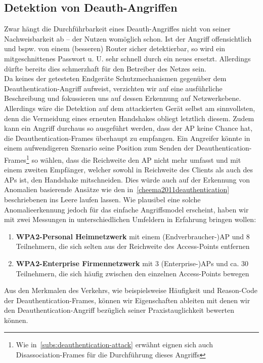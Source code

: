 \subsection{Detektion von Deauth-Angriffen}
Zwar hängt die Durchführbarkeit eines Deauth-Angriffes nicht von seiner Nachweisbarkeit ab -- der Nutzen womöglich schon. Ist der Angriff offensichtlich und bspw. von einem (besseren) Router sicher detektierbar, so wird ein mitgeschnittenes Passwort u. U. sehr schnell durch ein neues ersetzt. Allerdings dürfte bereits dies schmerzhaft für den Betreiber des Netzes sein.\\
Da keines der getesteten Endgeräte Schutzmechanismen gegenüber dem Deauthentication-Angriff aufweist, verzichten wir auf eine ausführliche Beschreibung und fokussieren uns auf dessen Erkennung auf Netzwerkebene. Allerdings wäre die Detektion auf dem attackierten Gerät selbst am sinnvollsten, denn die Vermeidung eines erneuten Handshakes obliegt letztlich diesem. Zudem kann ein Angriff durchaus so ausgeführt werden, dass der AP keine Chance hat, die Deauthentication-Frames überhaupt zu empfangen.
Ein Angreifer könnte in einem aufwendigeren Szenario seine Position zum Senden der Deauthentication-Frames\footnote{Wie in~\ref{subs:deauthentication-attack} erwähnt eignen sich auch Disassociation-Frames für die Durchführung dieses Angriffs} so wählen, dass die Reichweite den AP nicht mehr umfasst und mit einem zweiten Empfänger, welcher sowohl in Reichweite des Clients als auch des APs ist, den Handshake mitschneiden.
Dies würde auch auf der Erkennung von Anomalien basierende Ansätze wie den in~\ref{cheema2011deauthentication} beschriebenen ins Leere laufen lassen. Wie plausibel eine solche Anomalieerkennung jedoch für das einfache Angriffsmodel erscheint, haben wir mit zwei Messungen in unterschiedlichen Umfeldern in Erfahrung bringen wollen:
\begin{enumerate}
	\item \textbf{WPA2-Personal Heimnetzwerk} mit einem (Endverbraucher-)AP und 8 Teilnehmern, die sich selten aus der Reichweite des Access-Points entfernen
	\item \textbf{WPA2-Enterprise Firmennetzwerk} mit 3 (Enterprise-)APs und ca. 30 Teilnehmern, die sich häufig zwischen den einzelnen Access-Points bewegen
\end{enumerate}
Aus den Merkmalen des Verkehrs, wie beispielsweise Häufigkeit und Reason-Code der Deauthentication-Frames, können wir Eigenschaften ableiten mit denen wir den Deauthentication-Angriff bezüglich seiner Praxistauglichkeit bewerten können.\\

